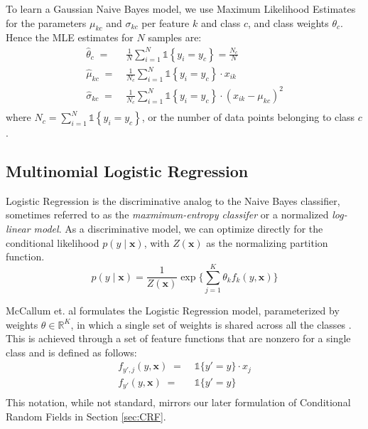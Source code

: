 \documentclass{article}
\begin{document}
To learn a Gaussian Naive Bayes model, we use Maximum Likelihood Estimates for
the parameters $\mu_{kc}$ and $\sigma_{kc}$ per feature $k$ and class $c$, and class weights
$\theta_c$. Hence the MLE estimates for $N$ samples are:
\begin{equation}
  \begin{aligned}
    \hat{\theta}_c \; = \; & \frac{1}{N} \sum_{i=1}^N \mathds{1} \left \{ y_i = y_c \right \} = \frac{N_c}{N} \\
    \hat{\mu}_{kc} \; = \; & \frac{1}{N_c} \sum_{i=1}^N \mathds{1} \left \{ y_i = y_c \right \} \cdot x_{ik} \\
    \hat{\sigma}_{kc} \; = \; & \frac{1}{N_c} \sum_{i=1}^N \mathds{1} \left \{ y_i = y_c \right \} \cdot \left( x_{ik} - \mu_{kc} \right)^2 \\
  \end{aligned}
\end{equation}
where $N_c = \sum_{i=1}^N \mathds{1} \left \{ y_i = y_c \right \} $, or the number
of data points belonging to class $c$ \cite{murphy}.
\subsection{Multinomial Logistic Regression}
\label{sec:LR}
Logistic Regression is the discriminative analog to the Naive Bayes
classifier, sometimes referred to as the \textit{maxmimum-entropy classifer}
or a normalized \textit{log-linear model}. As a discriminative model,
we can optimize directly for the conditional likelihood $p(y \mid \mathbf{x})$,
with $Z(\mathbf{x})$ as the normalizing partition function.
\begin{equation}
  p(y \mid \mathbf{x}) = \frac{1}{Z(\mathbf{x})} \exp \Bigg\{ \sum_{j=1}^K \theta_k f_k\left( y, \mathbf{x} \right) \Bigg\}
\end{equation}

McCallum et. al formulates the Logistic Regression model, parameterized by
weights $\theta \in \mathbb{R}^K$, in which a single set of weights is shared
across all the classes \cite{McCallumCRF}. This is achieved through a set of
feature functions that are nonzero for a single class and is defined as follows:
\begin{equation}
  \begin{aligned}
    f_{y', j} \left( y, \mathbf{x} \right) \; = \; & \mathds{1} \{ y' = y \} \cdot x_j \\
    f_{y'} \left(y, \mathbf{x}\right) \; = \; & \mathds{1} \{ y' = y \} \\
  \end{aligned}
\end{equation}
This notation, while not standard, mirrors our later formulation of Conditional
Random Fields in Section \ref{sec:CRF}.
\end{document}
